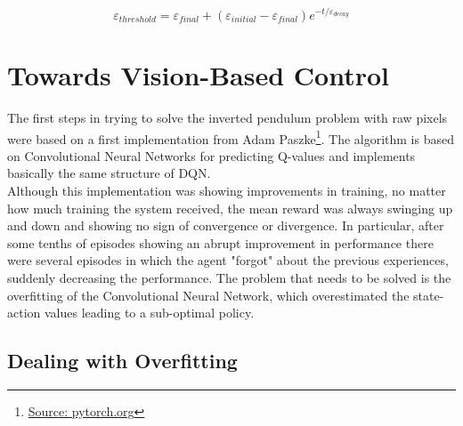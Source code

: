\documentclass[11pt]{article}
\begin{document}
\begin{equation}
	\varepsilon_{threshold} = \varepsilon_{final} + (\varepsilon_{initial}-\varepsilon_{final})e^{-t/\varepsilon_{decay}}
\end{equation}



\section{Towards Vision-Based Control}

The first steps in trying to solve the inverted pendulum problem with raw pixels were based on a first implementation from Adam Paszke\footnote{\href{https://pytorch.org/tutorials/intermediate/reinforcement_q_learning.html}{Source: pytorch.org}}. The algorithm is based on Convolutional Neural Networks for predicting Q-values and implements basically the same structure of DQN.\\
Although this implementation was showing improvements in training, no matter how much training the system received, the mean reward was always swinging up and down and showing no sign of convergence or divergence. In particular, after some tenths of episodes showing an abrupt improvement in performance there were several episodes in which the agent "forgot" about the previous experiences, suddenly decreasing the performance. The problem that needs to be solved is the overfitting of the Convolutional Neural Network, which overestimated the state-action values leading to a sub-optimal policy.

\subsection{Dealing with Overfitting}

\end{document}

